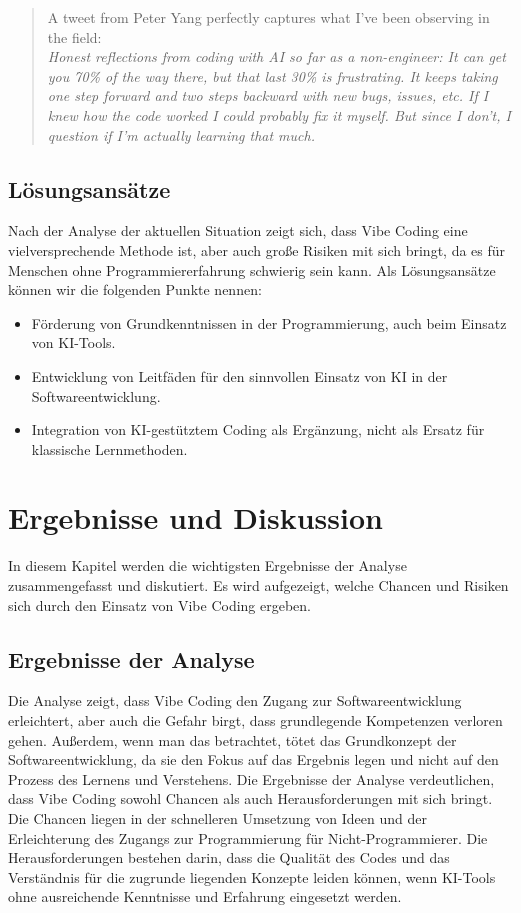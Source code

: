 \documentclass[paper=a4,fontsize=12pt,ngerman]{scrartcl}
\begin{document}
\begin{quote}
A tweet from Peter Yang perfectly captures what I’ve been observing in the field: \\
\textit{Honest reflections from coding with AI so far as a non-engineer: It can get you 70\% of the way there, but that last 30\% is frustrating. It keeps taking one step forward and two steps backward with new bugs, issues, etc. If I knew how the code worked I could probably fix it myself. But since I don’t, I question if I’m actually learning that much.}
\citep{VibeCodingTheFutureOfProgramming}
\end{quote}

\subsection{Lösungsansätze}
Nach der Analyse der aktuellen Situation zeigt sich, dass Vibe Coding eine vielversprechende Methode ist, aber auch große Risiken mit sich bringt, da es für Menschen ohne Programmiererfahrung schwierig sein kann. 
Als Lösungsansätze können wir die folgenden Punkte nennen:
\begin{itemize}
    \item Förderung von Grundkenntnissen in der Programmierung, auch beim Einsatz von KI-Tools.
    \item Entwicklung von Leitfäden für den sinnvollen Einsatz von KI in der Softwareentwicklung.
    \item Integration von KI-gestütztem Coding als Ergänzung, nicht als Ersatz für klassische Lernmethoden.
\end{itemize}

\clearpage
\section{Ergebnisse und Diskussion}
In diesem Kapitel werden die wichtigsten Ergebnisse der Analyse zusammengefasst und diskutiert. Es wird aufgezeigt, welche Chancen und Risiken sich durch den Einsatz von Vibe Coding ergeben.

\subsection{Ergebnisse der Analyse}
Die Analyse zeigt, dass Vibe Coding den Zugang zur Softwareentwicklung erleichtert, aber auch die Gefahr birgt, dass grundlegende Kompetenzen verloren gehen.
Außerdem, wenn man das betrachtet, tötet das Grundkonzept der Softwareentwicklung, da sie den Fokus auf das Ergebnis legen und nicht auf den Prozess des Lernens und Verstehens.
Die Ergebnisse der Analyse verdeutlichen, dass Vibe Coding sowohl Chancen als auch Herausforderungen mit sich bringt.
Die Chancen liegen in der schnelleren Umsetzung von Ideen und der Erleichterung des Zugangs zur Programmierung für Nicht-Programmierer.
Die Herausforderungen bestehen darin, dass die Qualität des Codes und das Verständnis für die zugrunde liegenden Konzepte leiden können, wenn KI-Tools ohne ausreichende Kenntnisse und Erfahrung eingesetzt werden.
\end{document}
